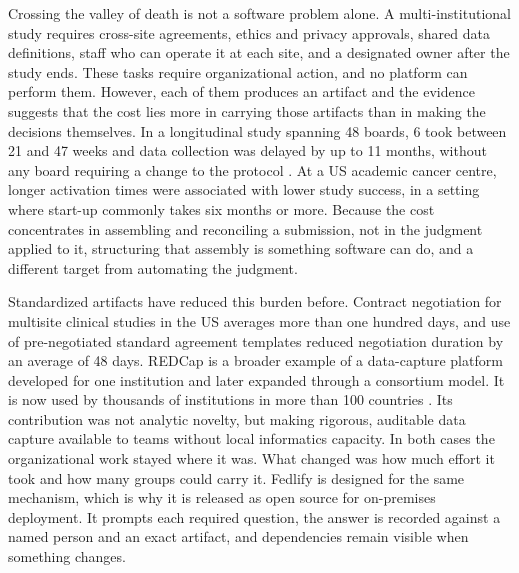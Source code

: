 \documentclass[preprint,5p, 10pt, times]{elsarticle}
\begin{document}
Crossing the valley of death is not a software problem alone. 
A multi-institutional study requires cross-site agreements, ethics and privacy approvals, shared data definitions, staff who can operate it at each site, and a designated owner after the study ends. These tasks require organizational action, and no platform can perform them. 
%
However, each of them produces an artifact and the evidence suggests that the cost lies more in carrying those artifacts than in making the decisions themselves.
%
In a longitudinal study spanning 48 boards, 6 took between 21 and 47 weeks and data collection was delayed by up to 11 months, without any board requiring a change to the protocol \cite{mccausland2024irb}.
%
At a US academic cancer centre, longer activation times were associated with lower study success, in a setting where start-up commonly takes six months or more\cite{ratnayake2024evaluating}.
%
Because the cost concentrates in assembling and reconciling a submission, not in the judgment applied to it, structuring that assembly is something software can do, and a different target from automating the judgment.


Standardized artifacts have reduced this burden before. 
Contract negotiation for multisite clinical studies in the US averages more than one hundred days, and use of pre-negotiated standard agreement templates reduced negotiation duration by an average of 48 days\cite{lawrence2023quantitative}.
%
REDCap is a broader example of a data-capture platform developed for one institution and later expanded through a consortium model. It is now used by thousands of institutions in more than 100 countries \cite{harris2019redcap}.
%
Its contribution was not analytic novelty, but making rigorous, auditable data capture available to teams without local informatics capacity.
In both cases the organizational work stayed where it was. What changed was how much effort it took and how many groups could carry it. Fedlify is designed for the same mechanism, which is why it is released as open source for on-premises deployment. 
%
It prompts each required question, the answer is recorded against a named person and an exact artifact, and dependencies remain visible when something changes. 
\end{document}
